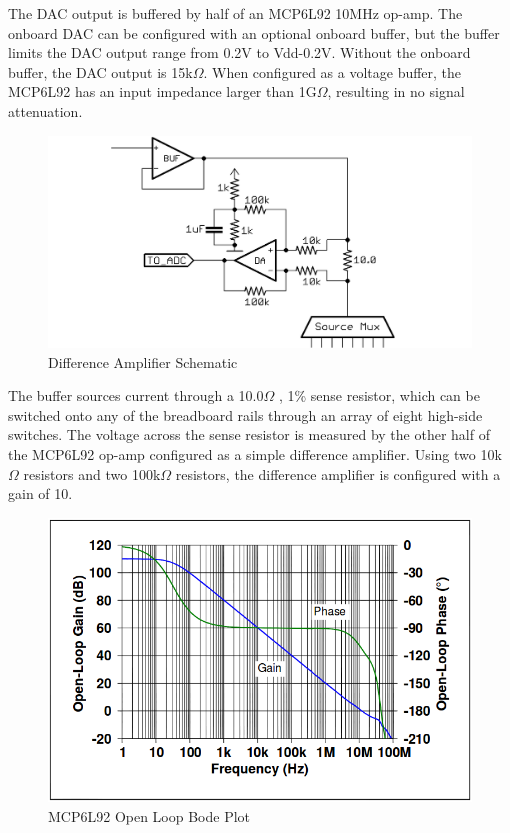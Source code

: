 \documentclass[11pt,twoside]{mitthesis}
\newcommand{\ohm}{$\Omega$ }
\begin{document}
The DAC output is buffered by half of an MCP6L92 10MHz op-amp.
The onboard DAC can be configured with an optional onboard buffer, but the buffer limits the DAC output range from 0.2V to Vdd-0.2V.
Without the onboard buffer, the DAC output is 15k$\Omega$.
When configured as a voltage buffer, the MCP6L92 has an input impedance larger than 1G$\Omega$, resulting in no signal attenuation.

\begin{figure}[h!]
  \begin{center}
      \includegraphics[width=.7\textwidth]{../DA.png}
      \caption{Difference Amplifier Schematic}
  \end{center}
\end{figure}

The buffer sources current through a 10.0\ohm, 1\% sense resistor, which can be switched onto any of the breadboard rails through an array of eight high-side switches.
The voltage across the sense resistor is measured by the other half of the MCP6L92 op-amp configured as a simple difference amplifier.
Using two 10k\ohm resistors and two 100k\ohm resistors, the difference amplifier is configured with a gain of 10.  

\begin{figure}[h!]
  \begin{center}
      \includegraphics[width=.6\textwidth]{../opamp-bode.png}
      \caption{MCP6L92 Open Loop Bode Plot}
  \end{center}
\end{figure}
\end{document}
